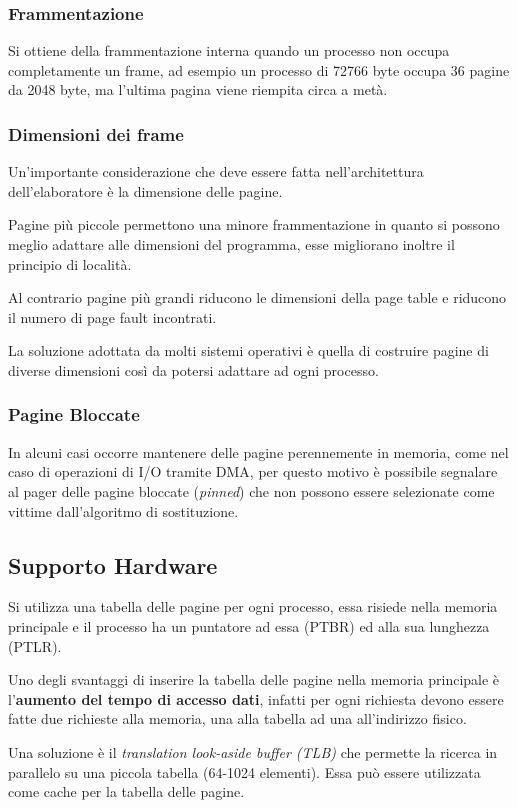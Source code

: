 \subsubsection*{Frammentazione}
Si ottiene della frammentazione interna quando un processo non occupa completamente un frame, ad esempio un processo di 72766 byte occupa 36 pagine da 2048 byte, ma l'ultima pagina viene riempita circa a metà.

\subsubsection*{Dimensioni dei frame}
Un'importante considerazione che deve essere fatta nell'architettura dell'elaboratore è la dimensione delle pagine.

Pagine più piccole permettono una minore frammentazione in quanto si possono meglio adattare alle dimensioni del programma, esse migliorano inoltre il principio di località.

Al contrario pagine più grandi riducono le dimensioni della page table e riducono il numero di page fault incontrati.

La soluzione adottata da molti sistemi operativi è quella di costruire pagine di diverse dimensioni così da potersi adattare ad ogni processo.

\subsubsection*{Pagine Bloccate}
In alcuni casi occorre mantenere delle pagine perennemente in memoria, come nel caso di operazioni di I/O tramite DMA, per questo motivo è possibile segnalare al pager delle pagine bloccate (\textit{pinned}) che non possono essere selezionate come vittime dall'algoritmo di sostituzione.

\subsection{Supporto Hardware}
Si utilizza una tabella delle pagine per ogni processo, essa risiede nella memoria principale e il processo ha un puntatore ad essa (PTBR) ed alla sua lunghezza (PTLR).

\spacer
Uno degli svantaggi di inserire la tabella delle pagine nella memoria principale è l'\textbf{aumento del tempo di accesso dati}, infatti per ogni richiesta devono essere fatte due richieste alla memoria, una alla tabella ad una all'indirizzo fisico.

\spacer
Una soluzione è il \textit{translation look-aside buffer (TLB)} che permette la ricerca in parallelo su una piccola tabella (64-1024 elementi). Essa può essere utilizzata come cache per la tabella delle pagine.

